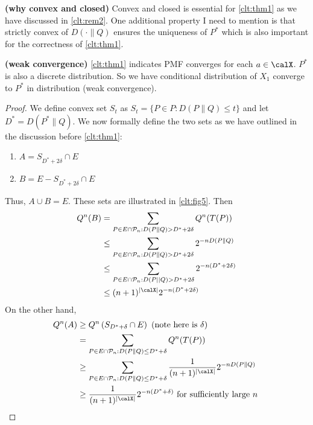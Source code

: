 \documentclass{article}
\newcommand{\bfs}[1]{\textbf{({#1})}}
\newcommand{\typss}{\mathcal{P}_n}
\begin{document}
\begin{rema}{\bfs{why convex and closed}}
    Convex and closed is essential for \cref{clt:thm1} as we have discussed in \cref{clt:rem2}. One additional property I need to mention is that strictly convex of $D(\cdot \| Q)$ ensures the uniqueness of $P^*$ which is also important for the correctness of  \cref{clt:thm1}.
\end{rema}

\begin{rema}{\bfs{weak convergence}}
    \cref{clt:thm1} indicates PMF converges for each $a\in \calX$. $P^{*}$ is also a discrete distribution. So we have conditional distribution of $X_{1}$ converge to $P^{*}$ in distribution (weak convergence).
\end{rema}

\begin{proof}
We define convex set $S_{t}$ as 
$S_{t}=\{P \in P : D(P \| Q) \leq t\}
$ and let 
$D^{*}=D\left(P^{*} \| Q\right)$. 
We now formally define the two sets as we have outlined in the discussion before \cref{clt:thm1}:
\begin{enumerate}
    \item $A=S_{D^{*}+2 \delta} \cap E$
    \item $ B=E-S_{D^{*}+2 \delta} \cap E$
\end{enumerate}
Thus, $A \cup B=E .$ These sets are illustrated in \cref{clt:fig5}. Then
\begin{align*}
\begin{aligned}
Q^{n}(B) &=\sum_{P \in E \cap \typss: D(P \| Q)>D^{*}+2 \delta} Q^{n}(T(P)) \\
& \leq \sum_{P \in E \cap \typss: D(P \| Q)>D^{*}+2 \delta} 2^{-n D(P \| Q)} \\
& \leq \sum_{P \in E \cap \typss: D(P|| Q)>D^{*}+2 \delta} 2^{-n\left(D^{*}+2 \delta\right)} \\
& \leq(n+1)^{| \calX |} 2^{-n\left(D^{*}+2 \delta\right)}
\end{aligned}
\end{align*}
On the other hand,
\begin{align*}
\begin{aligned}
Q^{n}(A) & \geq Q^{n}\left(S_{D^{*}+\delta} \cap E\right)  \text{ (note here is $\delta$) }\\
&=\sum_{P \in E \cap \typss: D(P \| Q) \leq D^{*}+\delta} Q^{n}(T(P)) \\
& \geq \sum_{P \in E \cap \typss: D(P \| Q) \leq D^{*}+\delta} \frac{1}{(n+1)^{| \calX |}} 2^{-n D(P \| Q)}\\
&\geq \frac{1}{(n+1)^{| \calX |}} 2^{-n\left(D^{*}+\delta\right)} \text{ for sufficiently large $n$ }
\end{aligned}
\end{align*}


\end{proof}
\end{document}
